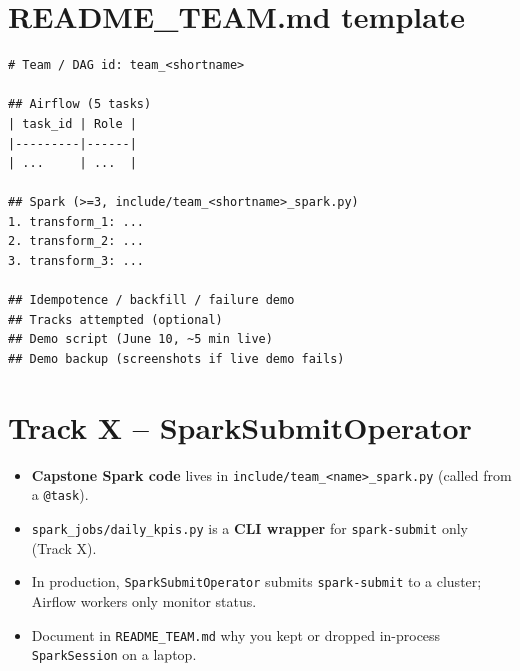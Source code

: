 \documentclass[11pt,a4paper]{article}
\begin{document}
\section{README\_TEAM.md template}
\label{app:readme}

\begin{lstlisting}
# Team / DAG id: team_<shortname>

## Airflow (5 tasks)
| task_id | Role |
|---------|------|
| ...     | ...  |

## Spark (>=3, include/team_<shortname>_spark.py)
1. transform_1: ...
2. transform_2: ...
3. transform_3: ...

## Idempotence / backfill / failure demo
## Tracks attempted (optional)
## Demo script (June 10, ~5 min live)
## Demo backup (screenshots if live demo fails)
\end{lstlisting}

\section{Track X -- SparkSubmitOperator}
\label{app:trackx}

\begin{itemize}[nosep]
  \item \textbf{Capstone Spark code} lives in \texttt{include/team\_<name>\_spark.py} (called from a \texttt{@task}).
  \item \texttt{spark\_jobs/daily\_kpis.py} is a \textbf{CLI wrapper} for \texttt{spark-submit} only (Track X).
  \item In production, \texttt{SparkSubmitOperator} submits \texttt{spark-submit} to a cluster;
        Airflow workers only monitor status.
  \item Document in \texttt{README\_TEAM.md} why you kept or dropped in-process \texttt{SparkSession} on a laptop.
\end{itemize}
\end{document}
